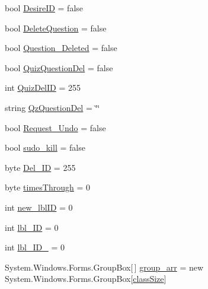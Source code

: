 \begin{DoxyCompactItemize}
\item 
bool \hyperlink{class_sr_p___classroom_inq_1_1frm_classrrom_inq_aad36cc9a93fb79969dd3b0d0fe52b793}{\-Desire\-I\-D} = false
\item 
bool \hyperlink{class_sr_p___classroom_inq_1_1frm_classrrom_inq_ab3a8803fac827da5757e7451c1836010}{\-Delete\-Question} = false
\item 
bool \hyperlink{class_sr_p___classroom_inq_1_1frm_classrrom_inq_a8f54ae3a0ea7bb9dafed984a53155fd8}{\-Question\-\_\-\-Deleted} = false
\item 
bool \hyperlink{class_sr_p___classroom_inq_1_1frm_classrrom_inq_aa1c6ba1dda756081aba5b3cfea87b09d}{\-Quiz\-Question\-Del} = false
\item 
int \hyperlink{class_sr_p___classroom_inq_1_1frm_classrrom_inq_a2221a860fdb3bc2837b3ca3c0cee182c}{\-Quiz\-Del\-I\-D} = 255
\item 
string \hyperlink{class_sr_p___classroom_inq_1_1frm_classrrom_inq_a1fe88369748706492ccc7292a0e47331}{\-Qz\-Question\-Del} = \char`\"{}\char`\"{}
\item 
bool \hyperlink{class_sr_p___classroom_inq_1_1frm_classrrom_inq_acb5bab8dcbcbfc8ed7a5b260ddba84e3}{\-Request\-\_\-\-Undo} = false
\item 
bool \hyperlink{class_sr_p___classroom_inq_1_1frm_classrrom_inq_a3ac2217a30904b65be786ee00a312fea}{sudo\-\_\-kill} = false
\item 
byte \hyperlink{class_sr_p___classroom_inq_1_1frm_classrrom_inq_a9874b3534409b79a483f08f2aa03668d}{\-Del\-\_\-\-I\-D} = 255
\item 
byte \hyperlink{class_sr_p___classroom_inq_1_1frm_classrrom_inq_ab730336bf81938256d6f20922c15484b}{times\-Through} = 0
\item 
int \hyperlink{class_sr_p___classroom_inq_1_1frm_classrrom_inq_a561cfd5c0d34d4adcb14aee4efc01643}{new\-\_\-lbl\-I\-D} = 0
\item 
int \hyperlink{class_sr_p___classroom_inq_1_1frm_classrrom_inq_a15d44adc56e5e6523bfadd27d9966935}{lbl\-\_\-\-I\-D} = 0
\item 
int \hyperlink{class_sr_p___classroom_inq_1_1frm_classrrom_inq_a5d14fbec9e02ebe6942d26ae8ed53d3b}{lbl\-\_\-\-I\-D\-\_} = 0
\item 
\-System.\-Windows.\-Forms.\-Group\-Box\mbox{[}$\,$\mbox{]} \hyperlink{class_sr_p___classroom_inq_1_1frm_classrrom_inq_a68d2b307c87e71592f6e170c9ce2aad2}{group\-\_\-arr} = new \-System.\-Windows.\-Forms.\-Group\-Box\mbox{[}\hyperlink{class_sr_p___classroom_inq_1_1frm_classrrom_inq_a78d9aab335edfe53d39036b9d89928a8}{class\-Size}\mbox{]}

\end{DoxyCompactItemize}

